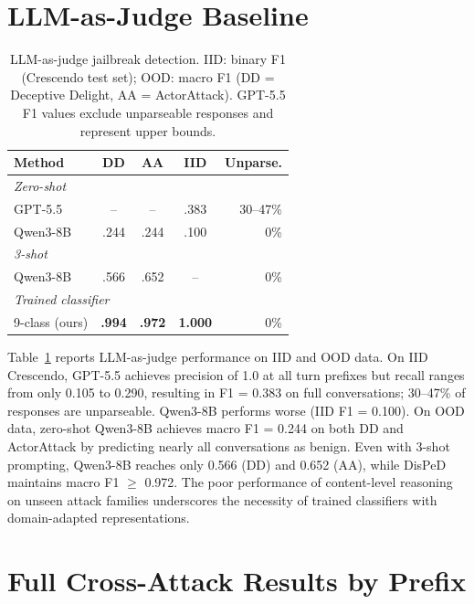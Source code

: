 
\appendix

\section{LLM-as-Judge Baseline}
\label{sec:llm_judge}

\begin{table}[t]
\centering
\small
\caption{LLM-as-judge jailbreak detection. IID: binary F1 (Crescendo test set); OOD: macro F1 (DD = Deceptive Delight, AA = ActorAttack). GPT-5.5 F1 values exclude unparseable responses and represent upper bounds.}
\label{tab:llm_judge}
\begin{tabular}{@{}lcccr@{}}
\toprule
\textbf{Method} & DD & AA & IID & Unparse. \\
\midrule
\multicolumn{5}{l}{\textit{Zero-shot}} \\[2pt]
GPT-5.5 & -- & -- & .383 & 30--47\% \\
Qwen3-8B & .244 & .244 & .100 & 0\% \\
\midrule
\multicolumn{5}{l}{\textit{3-shot}} \\[2pt]
Qwen3-8B & .566 & .652 & -- & 0\% \\
\midrule
\multicolumn{5}{l}{\textit{Trained classifier}} \\[2pt]
9-class (ours) & \textbf{.994} & \textbf{.972} & \textbf{1.000} & 0\% \\
\bottomrule
\end{tabular}
\end{table}

Table~\ref{tab:llm_judge} reports LLM-as-judge performance on IID and OOD data.
On IID Crescendo, GPT-5.5 achieves precision of 1.0 at all turn prefixes but recall ranges from only 0.105 to 0.290, resulting in F1 = 0.383 on full conversations; 30--47\% of responses are unparseable.
Qwen3-8B performs worse (IID F1 = 0.100).
On OOD data, zero-shot Qwen3-8B achieves macro F1 = 0.244 on both DD and ActorAttack by predicting nearly all conversations as benign.
Even with 3-shot prompting, Qwen3-8B reaches only 0.566 (DD) and 0.652 (AA), while DisPeD maintains macro F1 $\geq$ 0.972.
The poor performance of content-level reasoning on unseen attack families underscores the necessity of trained classifiers with domain-adapted representations.

\section{Full Cross-Attack Results by Prefix}
\label{sec:full_prefix}

